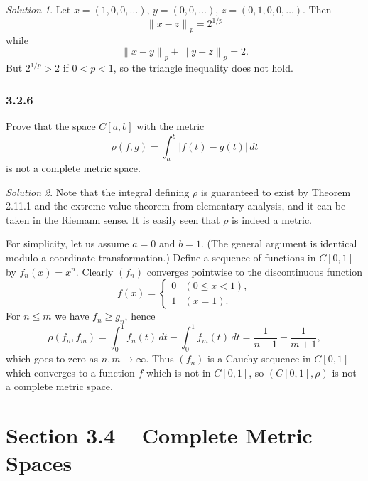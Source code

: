 \documentclass{report}
\newcommand{\norm}[1]{{\lVert #1 \rVert}}
\theoremstyle{remark}
\newtheorem*{solution}{Solution}
\begin{document}
\begin{solution}
  Let $x = (1,0,0,\dots)$, $y = (0,0,\dots)$, $z = (0,1,0,0,\dots)$. Then
  \begin{equation*}
    \norm{x-z}_p = 2^{1/p}
  \end{equation*}
  while
  \begin{equation*}
    \norm{x-y}_p + \norm{y-z}_p = 2.
  \end{equation*}
  But $2^{1/p} > 2$ if $0 < p < 1$, so the triangle inequality does not hold.
\end{solution}

\subsubsection*{3.2.6}
Prove that the space $C[a,b]$ with the metric
\begin{equation*}
  \rho(f,g) = \int_a^b |f(t) - g(t)| \, dt
\end{equation*}
is not a complete metric space.

\begin{solution}
  Note that the integral defining $\rho$ is guaranteed to exist by Theorem 2.11.1 and the extreme value theorem from elementary analysis, and it can be taken in the Riemann sense. It is easily seen that $\rho$ is indeed a metric. 

  For simplicity, let us assume $a = 0$ and $b = 1$. (The general argument is identical modulo a coordinate transformation.) Define a sequence of functions in $C[0,1]$ by $f_n(x) = x^n$. Clearly $(f_n)$ converges pointwise to the discontinuous function
  \begin{equation*}
    f(x) =
    \begin{cases}
      0 & (0 \le x < 1), \\
      1 & (x = 1).
    \end{cases}
  \end{equation*}
  For $n \le m$ we have $f_n \ge g_n$, hence
  \begin{equation*}
    \rho(f_n, f_m) = \int_0^1 f_n(t) \, dt - \int_0^1 f_m(t) \, dt = \frac{1}{n+1} - \frac{1}{m+1},
  \end{equation*}
  which goes to zero as $n,m \to \infty$. Thus $(f_n)$ is a Cauchy sequence in $C[0,1]$ which converges to a function $f$ which is not in $C[0,1]$, so $(C[0,1], \rho)$ is not a complete metric space.
\end{solution}

\section*{Section 3.4 -- Complete Metric Spaces}
\end{document}
